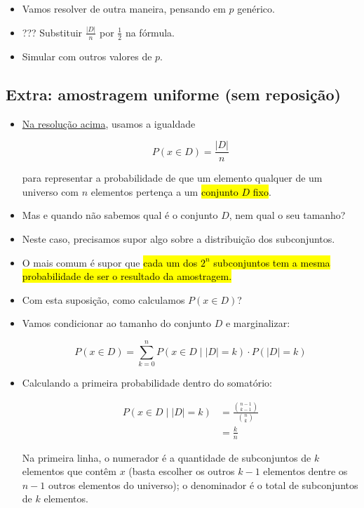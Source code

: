 \documentclass[
  11pt]{report}
\begin{document}
\begin{itemize}
\item
  Vamos resolver de outra maneira, pensando em $p$ genérico.
\item
  ??? Substituir $\frac{|D|}{n}$ por $\frac 1 2$ na fórmula.
\item
  Simular com outros valores de $p$.
\end{itemize}

\hypertarget{amostra}{%
\subsection*{Extra: amostragem uniforme (sem reposição)}\label{amostra}}

\begin{itemize}
\item
  \protect\hyperlink{amigos}{Na resolução acima}, usamos a igualdade

  \[
  P(x \in D) = \frac{|D|}{n}
  \]

  para representar a probabilidade de que um elemento qualquer de um universo com $n$ elementos pertença a um {\hl{conjunto $D$ fixo}}.
\item
  Mas e quando não sabemos qual é o conjunto $D$, nem qual o seu tamanho?
\item
  Neste caso, precisamos supor algo sobre a distribuição dos subconjuntos.
\item
  O mais comum é supor que {\hl{cada um dos $2^n$ subconjuntos tem a mesma probabilidade de ser o resultado da amostragem.}}
\item
  Com esta suposição, como calculamos $P(x \in D)$?
\item
  Vamos condicionar ao tamanho do conjunto $D$ e marginalizar:

  \[
  P(x \in D) = \sum_{k = 0}^{n} P(x \in D \mid |D| = k) \cdot P(|D| = k)
  \]
\item
  Calculando a primeira probabilidade dentro do somatório:

  \[
  \begin{aligned}
  P(x \in D \mid |D| = k) 
  &= \frac{\binom{n - 1}{k - 1}}{\binom n k} \\
  &= \frac k n
  \end{aligned}
  \]

  Na primeira linha, o numerador é a quantidade de subconjuntos de $k$ elementos que contêm $x$ (basta escolher os outros $k - 1$ elementos dentre os $n - 1$ outros elementos do universo); o denominador é o total de subconjuntos de $k$ elementos.


\end{itemize}
\end{document}
